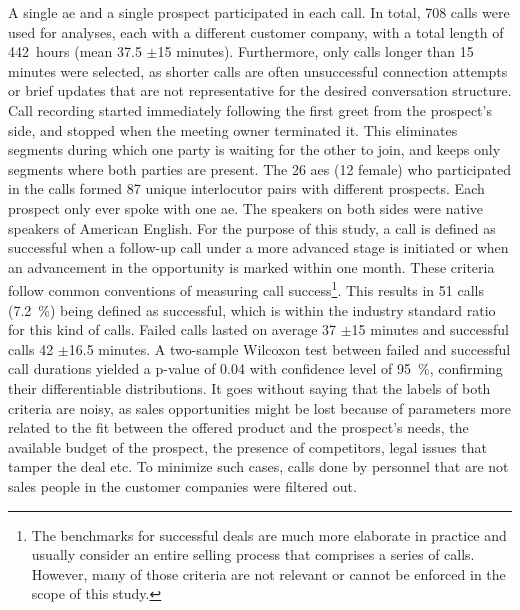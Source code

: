 A single \ac{ae} and a single prospect participated in each call.
In total, 708 calls were used for analyses, each with a different customer company, with a total length of \SI{442}{hours} (mean 37.5 $\pm$15 minutes).
Furthermore, only calls longer than 15 minutes were selected, as shorter calls are often unsuccessful connection attempts or brief updates that are not representative for the desired conversation structure.
Call recording started immediately following the first greet from the prospect's side, and stopped when the meeting owner terminated it.
This eliminates segments during which one party is waiting for the other to join, and keeps only segments where both parties are present.
The 26 \acp{ae} (12 female) who participated in the calls formed 87 unique interlocutor pairs with different prospects.
Each prospect only ever spoke with one \ac{ae}.
The speakers on both sides were native speakers of American English.
For the purpose of this study, a call is defined as successful when a follow-up call under a more advanced stage is initiated or when an advancement in the opportunity is marked within one month.
These criteria follow common conventions of measuring call success\footnote{The benchmarks for successful deals are much more elaborate in practice and usually consider an entire selling process that comprises a series of calls.
However, many of those criteria are not relevant or cannot be enforced in the scope of this study.}.
This results in 51 calls (\SI{7.2}{\percent}) being defined as successful, which is within the industry standard ratio for this kind of calls.
Failed calls lasted on average 37 $\pm$15 minutes and successful calls 42 $\pm$16.5 minutes.
A two-sample Wilcoxon test \citep{Wilcoxon1945individual} between failed and successful call durations yielded a p-value of 0.04 with confidence level of \SI{95}{\percent}, confirming their differentiable distributions.
It goes without saying that the labels of both criteria are noisy, as sales opportunities might be lost because of parameters more related to the fit between the offered product and the prospect's needs, the available budget of the prospect, the presence of competitors, legal issues that tamper the deal etc.
To minimize such cases, calls done by personnel that are not sales people in the customer companies were filtered out.

